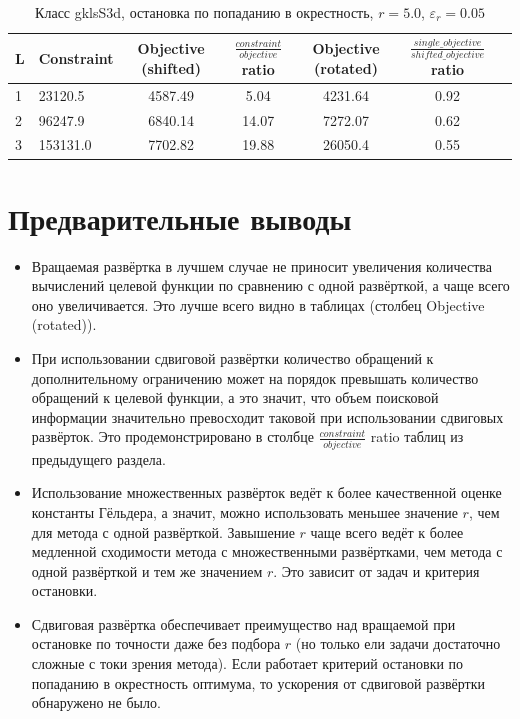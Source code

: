 \documentclass[a4paper]{article}
\begin{document}
\begin{table}[H]
\begin{center}
\caption{Класс gklsS3d, остановка по попаданию в окрестность, $r=5.0$, $\varepsilon_r=0.05$}
  \begin{tabular}{l|l*{5}{c}}
  L & Constraint & Objective (shifted) & $\frac{constraint}{objective}$ ratio & Objective (rotated) & $\frac{single\_objective}{shifted\_objective}$ ratio \\
  \hline
  1 & 23120.5  & 4587.49 &  5.04 & 4231.64 & 0.92 \\
  2 & 96247.9  & 6840.14 & 14.07 & 7272.07 & 0.62 \\
  3 & 153131.0 & 7702.82 & 19.88 & 26050.4 & 0.55 \\
  \end{tabular}
\end{center}
\end{table}

\section{Предварительные выводы}
\begin{itemize}
  \item Вращаемая развёртка в лучшем случае не приносит увеличения количества вычислений целевой функции по сравнению с одной развёрткой, а чаще всего оно увеличивается. Это лучше всего видно в таблицах (столбец Objective (rotated)).
  \item При использовании сдвиговой развёртки количество обращений к дополнительному ограничению может на порядок превышать количество обращений к целевой функции, а это значит, что объем поисковой информации значительно превосходит таковой при использовании сдвиговых развёрток. Это продемонстрировано в столбце $\frac{constraint}{objective}$ ratio таблиц из предыдущего раздела.
  \item Использование множественных развёрток ведёт к более качественной оценке константы Гёльдера, а значит, можно использовать меньшее значение $r$, чем для метода с одной развёрткой. Завышение $r$ чаще всего ведёт к более медленной сходимости метода с множественными развёртками, чем метода с одной развёрткой и тем же значением $r$. Это зависит от задач и критерия остановки.
  \item Сдвиговая развёртка обеспечивает преимущество над вращаемой при остановке по точности даже без подбора $r$ (но только ели задачи достаточно сложные с токи зрения метода). Если работает критерий остановки по попаданию в окрестность оптимума, то ускорения от сдвиговой развёртки обнаружено не было.
\end{itemize}
\end{document}
